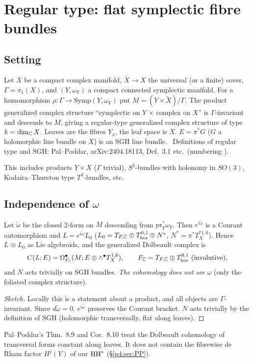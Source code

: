 \section{Regular type: flat symplectic fibre bundles}\label{p4:sec:regular}
\subsection{Setting}\label{p4:sec:setting}
\begin{defn}[Setting (S)]
Let $X$ be a compact complex manifold, $\tilde X\to X$ the universal (or a finite) cover, $\Gamma=\pi_1(X)$, and $(Y,\omega_Y)$ a compact connected symplectic manifold. For a homomorphism $\rho:\Gamma\to\mathrm{Symp}(Y,\omega_Y)$ put $M=(Y\times\tilde X)/\Gamma$. The product generalized complex structure ``symplectic on $Y$ $\times$ complex on $X$'' is $\Gamma$-invariant and descends to $M$, giving a regular-type generalized complex structure of type $k=\dim_\mathbb C X$. Leaves are the fibres $Y_x$, the leaf space is $X$. $E=\pi^*G$ ($G$ a holomorphic line bundle on $X$) is an SGH line bundle. \tC\ Definitions of regular type and SGH: Pal--Poddar, arXiv:2404.18113, Def.\ 3.1 etc.\ (numbering \tQ).
\end{defn}
\noindent This includes products $Y\times X$ ($\Gamma$ trivial), $S^2$-bundles with holonomy in $SO(3)$, Kodaira--Thurston type $T^2$-bundles, etc.

\subsection{Independence of $\omega$}
\begin{prop}\tP\label{p4:prop:L1}
Let $\tilde\omega$ be the closed 2-form on $M$ descending from $\mathrm{pr}_Y^*\omega_Y$. Then $e^{i\tilde\omega}$ is a Courant automorphism and $L=e^{i\tilde\omega}L_0$ ($L_0=T_{F,\mathbb C}\oplus T^{0,1}_{\mathrm{hor}}\oplus N^*$, $N^*=\pi^*T^{*1,0}_X$). Hence $L\cong L_0$ as Lie algebroids, and the generalized Dolbeault complex is
\[C(L;E)=\Omega^\bullet_{F_\C}(M;E\otimes\wedge^\bullet T^{1,0}_X),\qquad F_\C=T_{F,\C}\oplus T^{0,1}_{\mathrm{hor}}\ (\text{involutive}),\]
and $N$ acts trivially on SGH bundles. \emph{The cohomology does not see $\omega$} (only the foliated complex structure).
\end{prop}
\begin{proof}[Sketch]
Locally this is a statement about a product, and all objects are $\Gamma$-invariant. Since $d\tilde\omega=0$, $e^{i\tilde\omega}$ preserves the Courant bracket. $N$ acts trivially by the definition of SGH (holomorphic transversally, flat along leaves).\qedhere
\end{proof}
\begin{rem}\tC\tQ
Pal--Poddar's Thm.\ 8.9 and Cor.\ 8.10 treat the Dolbeault cohomology of transversal forms constant along leaves. It does not contain the fibrewise de Rham factor $H^j(Y)$ of our $\mathrm{HH}^*$ (\S\ref{p4:sec:PP}).
\end{rem}

